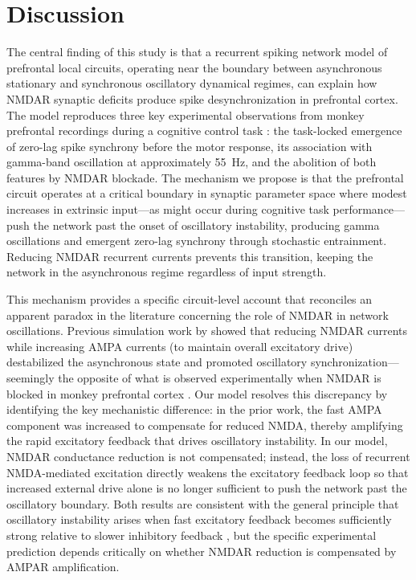 \documentclass[10pt]{article}
\begin{document}
\section{Discussion}

The central finding of this study is that a recurrent spiking network model of prefrontal local circuits, operating near the boundary between asynchronous stationary and synchronous oscillatory dynamical regimes, can explain how NMDAR synaptic deficits produce spike desynchronization in prefrontal cortex. The model reproduces three key experimental observations from monkey prefrontal recordings during a cognitive control task \citep{zick2018blocking}: the task-locked emergence of zero-lag spike synchrony before the motor response, its association with gamma-band oscillation at approximately 55~Hz, and the abolition of both features by NMDAR blockade. The mechanism we propose is that the prefrontal circuit operates at a critical boundary in synaptic parameter space where modest increases in extrinsic input---as might occur during cognitive task performance---push the network past the onset of oscillatory instability, producing gamma oscillations and emergent zero-lag synchrony through stochastic entrainment. Reducing NMDAR recurrent currents prevents this transition, keeping the network in the asynchronous regime regardless of input strength.

This mechanism provides a specific circuit-level account that reconciles an apparent paradox in the literature concerning the role of NMDAR in network oscillations. Previous simulation work by \citet{compte2000synaptic} showed that reducing NMDAR currents while increasing AMPA currents (to maintain overall excitatory drive) destabilized the asynchronous state and promoted oscillatory synchronization---seemingly the opposite of what is observed experimentally when NMDAR is blocked in monkey prefrontal cortex \citep{zick2018blocking}. Our model resolves this discrepancy by identifying the key mechanistic difference: in the prior work, the fast AMPA component was increased to compensate for reduced NMDA, thereby amplifying the rapid excitatory feedback that drives oscillatory instability. In our model, NMDAR conductance reduction is not compensated; instead, the loss of recurrent NMDA-mediated excitation directly weakens the excitatory feedback loop so that increased external drive alone is no longer sufficient to push the network past the oscillatory boundary. Both results are consistent with the general principle that oscillatory instability arises when fast excitatory feedback becomes sufficiently strong relative to slower inhibitory feedback \citep{wang1999synaptic}, but the specific experimental prediction depends critically on whether NMDAR reduction is compensated by AMPAR amplification.
\end{document}
